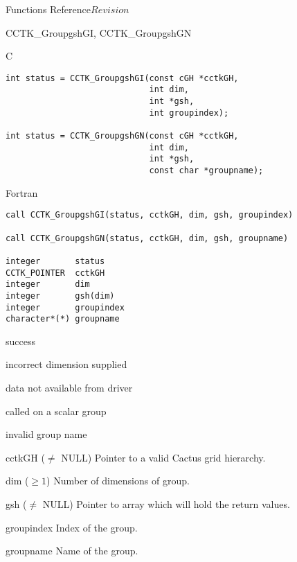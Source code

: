 \begin{cactuspart}{ Functions Reference}{}{$Revision$}
\begin{FunctionDescription}{CCTK\_GroupgshGI, CCTK\_GroupgshGN}
\begin{SynopsisSection}
\begin{Synopsis}{C}
\begin{verbatim}
int status = CCTK_GroupgshGI(const cGH *cctkGH,
                             int dim,
                             int *gsh,
                             int groupindex);

int status = CCTK_GroupgshGN(const cGH *cctkGH,
                             int dim,
                             int *gsh,
                             const char *groupname);
\end{verbatim}
\end{Synopsis}
\begin{Synopsis}{Fortran}
\begin{verbatim}
call CCTK_GroupgshGI(status, cctkGH, dim, gsh, groupindex)

call CCTK_GroupgshGN(status, cctkGH, dim, gsh, groupname)

integer       status
CCTK_POINTER  cctkGH
integer       dim
integer       gsh(dim)
integer       groupindex
character*(*) groupname
\end{verbatim}
\end{Synopsis}
\end{SynopsisSection}

\begin{ResultSection}
\begin{Result}{0} success \end{Result}
\begin{Result}{-1} incorrect dimension supplied \end{Result}
\begin{Result}{-2} data not available from driver \end{Result}
\begin{Result}{-3} called on a scalar group \end{Result}
\begin{Result}{-4} invalid group name \end{Result}
\end{ResultSection}

\begin{ParameterSection}
\begin{Parameter}{cctkGH ($\ne$ NULL)} Pointer to a valid Cactus grid hierarchy. \end{Parameter}
\begin{Parameter}{dim ($\ge 1$)} Number of dimensions of group. \end{Parameter}
\begin{Parameter}{gsh ($\ne$ NULL)} Pointer to array which will hold the return values. \end{Parameter}
\begin{Parameter}{groupindex} Index of the group. \end{Parameter}
\begin{Parameter}{groupname} Name of the group. \end{Parameter}
\end{ParameterSection}


\end{FunctionDescription}
\end{cactuspart}
